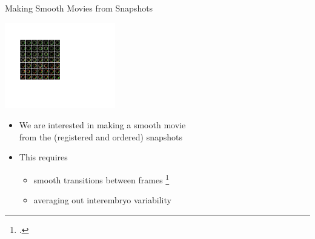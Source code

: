 \documentclass[10pt]{beamer}
\begin{document}
\begin{frame}{Making Smooth Movies from Snapshots}

\begin{center}
\includegraphics[width=1.9in]{fig5}

\begin{itemize}
\item We are interested in making a smooth movie \\ from the  (registered and ordered) snapshots
\item This requires 
\begin{itemize}
\item smooth transitions between frames \footcite{kemelmacher2011exploring}
\item averaging out interembryo variability
\end{itemize}
\end{itemize}

\end{center}

\end{frame}
\end{document}
